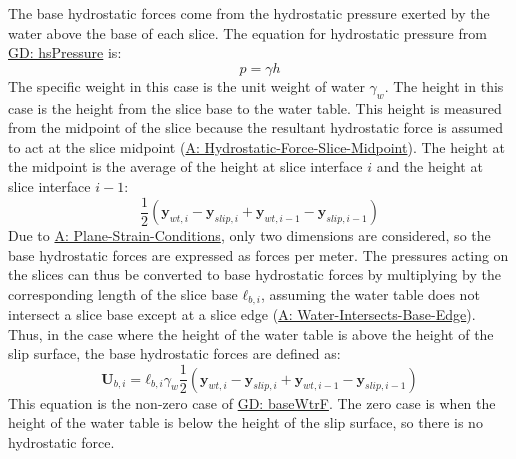 \documentclass[12pt]{article}
\begin{document}
The base hydrostatic forces come from the hydrostatic pressure exerted by the water above the base of each slice. The equation for hydrostatic pressure from \hyperref[GD:hsPressure]{GD: hsPressure} is:
\begin{displaymath}
p=γ h
\end{displaymath}
The specific weight in this case is the unit weight of water ${γ_{w}}$. The height in this case is the height from the slice base to the water table. This height is measured from the midpoint of the slice because the resultant hydrostatic force is assumed to act at the slice midpoint (\hyperref[assumpHFSM]{A: Hydrostatic-Force-Slice-Midpoint}). The height at the midpoint is the average of the height at slice interface $i$ and the height at slice interface $i-1$:
\begin{displaymath}
\frac{1}{2} \left({\mathbf{y}_{wt,i}}-{\mathbf{y}_{slip,i}}+{\mathbf{y}_{wt,i-1}}-{\mathbf{y}_{slip,i-1}}\right)
\end{displaymath}
Due to \hyperref[assumpPSC]{A: Plane-Strain-Conditions}, only two dimensions are considered, so the base hydrostatic forces are expressed as forces per meter. The pressures acting on the slices can thus be converted to base hydrostatic forces by multiplying by the corresponding length of the slice base ${\mathbf{ℓ}_{b,i}}$, assuming the water table does not intersect a slice base except at a slice edge (\hyperref[assumpWIBE]{A: Water-Intersects-Base-Edge}). Thus, in the case where the height of the water table is above the height of the slip surface, the base hydrostatic forces are defined as:
\begin{displaymath}
{\mathbf{U}_{b,i}}={\mathbf{ℓ}_{b,i}} {γ_{w}} \frac{1}{2} \left({\mathbf{y}_{wt,i}}-{\mathbf{y}_{slip,i}}+{\mathbf{y}_{wt,i-1}}-{\mathbf{y}_{slip,i-1}}\right)
\end{displaymath}
This equation is the non-zero case of \hyperref[GD:baseWtrF]{GD: baseWtrF}. The zero case is when the height of the water table is below the height of the slip surface, so there is no hydrostatic force.
\par~
\end{document}

